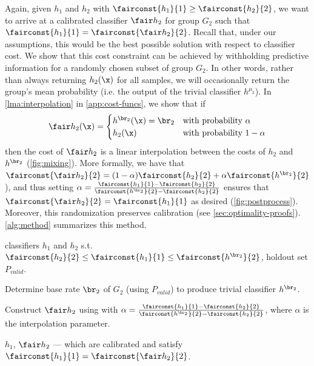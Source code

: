 Again, given $h_1$ and $h_2$ with $\fairconst{h_1}{1} \ge \fairconst{h_2}{2}$, we want
to arrive at a calibrated classifier $\fair h_2$ for group $G_2$ such that
$\fairconst{h_1}{1} = \fairconst{\fair h_2}{2}$. Recall that, under our
assumptions, this would be
the best possible solution with respect to classifier cost. We show that this cost
constraint can be achieved by withholding predictive information for a randomly
chosen subset of group $G_2$. In other words, rather than always returning $h_2(\x)$
for all samples, we will occasionally return the group's mean probability
(i.e. the output of the trivial classifier $h^{\mu_2}$). In
\autoref{lma:interpolation} in \autoref{app:cost-funcs}, we show
that if
\begin{equation}
  \label{eqn:interpolation}
  \fair h_2(\x) = \begin{cases}
    h^{\br_2}(\x) = \br_2 & \text{with probability } \alpha \\
    h_2(\x) & \text{with probability } 1-\alpha
  \end{cases}
\end{equation}
then the cost of $\fair h_2$ is a linear interpolation between the costs of
$h_2$ and $h^{\br_2}$ (\autoref{fig:mixing}). More formally, we
have that $\fairconst{\fair h_2}{2} = (1-\alpha)
\fairconst{h_2}{2} + \alpha \fairconst{h^{\br_2}}{2}$), and thus setting $\alpha =
\frac{\fairconst{h_1}{1} - \fairconst{h_2}{2}}{\fairconst{h^{\br_2}}{2} -
\fairconst{h_2}{2}}$ ensures that $\fairconst{\fair h_2}{2} =
\fairconst{h_1}{1}$ as desired (\autoref{fig:postprocess}).
Moreover, this randomization preserves calibration (see
\autoref{sec:optimality-proofs}).
\autoref{alg:method} summarizes this method.
\begin{algorithm}
  \caption{Achieving Calibration and an Equal-Cost Constraint via Information Withholding}
  \label{alg:method}
  \begin{algorithmic}
     classifiers $h_1$ and $h_2$ s.t.
    $\fairconst{h_2}{2} \leq \fairconst{h_1}{1} \leq \fairconst{h^{\br_2}}{2}$, holdout set $P_{valid}$.

    \begin{itemize}
      \STATE Determine base rate $\br_2$ of $G_2$ (using
        $P_{valid}$) to produce trivial classifier $h^{\br_2}$.

      \STATE Construct $\fair h_2$ using with
        $ \alpha = \frac{\fairconst{h_1}{1} - \fairconst{h_2}{2}}{\fairconst{h^{\br_2}}{2} - \fairconst{h_2}{2}}$,
        where $\alpha$ is the interpolation parameter.
    \end{itemize}

    \RETURN $h_1$, $\fair h_2$ --- which are calibrated and satisfy $\fairconst{h_1}{1} = \fairconst{\fair h_2}{2}$.
  \end{algorithmic}
\end{algorithm}


